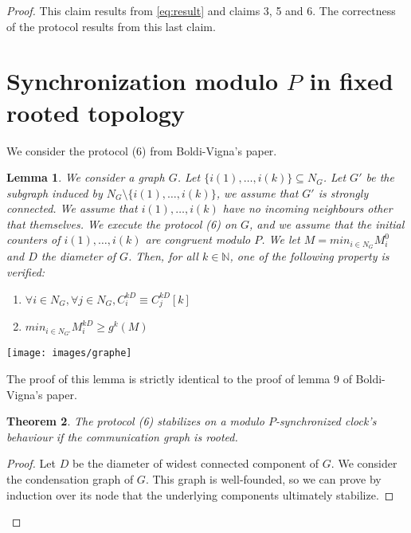 \documentclass[11pt,letterpaper]{article}
\newtheorem{thm}{Theorem}
\newtheorem{lem}[thm]{Lemma}
\begin{document}
\begin{proof}
	This claim results from \eqref{eq:result} and claims 3, 5 and 6.
	The correctness of the protocol results from this last claim.


\section{Synchronization modulo $P$ in fixed rooted topology}

	We consider the protocol (6) from Boldi-Vigna's paper.

\begin{lem} \label{lem:9_extended}
	We consider a graph $G$. Let $\{i(1), \dots, i(k)\} \subseteq N_G$.
	Let $G'$ be the subgraph induced by $N_G \setminus \{i(1), \dots, i(k)\}$, we assume that $G'$ is strongly connected.
	We assume that $i(1), \dots, i(k)$ have no incoming neighbours other that themselves.
	We execute the protocol (6) on $G$, and we assume that the initial counters of $i(1), \dots, i(k)$ are congruent modulo $P$.
	We let $M = min_{i \in N_G} M_i^0$ and $D$ the diameter of $G$.
	Then, for all $k \in \mathds{N}$, one of the following property is verified:

	\begin{enumerate}
		\item $\forall i \in N_G, \forall j \in N_G, C_i^{kD} \equiv C_j^{kD} [k]$
		\item $min_{i \in N_{G'}} M_i^{kD} \geq g^k(M)$
	\end{enumerate}
\end{lem}
\texttt{[image: images/graphe]}

The proof of this lemma is strictly identical to the proof of lemma 9 of Boldi-Vigna's paper.

\begin{thm} \label{thm:fixed_rooted}
	The protocol (6) stabilizes on a modulo $P$-synchronized clock's behaviour if the communication graph is rooted.
\end{thm}
\begin{proof}
	Let $D$ be the diameter of widest connected component of $G$.
	We consider the condensation graph of $G$.
	This graph is well-founded, so we can prove by induction over its node that the underlying components ultimately stabilize.


\end{proof}
\end{proof}
\end{document}
